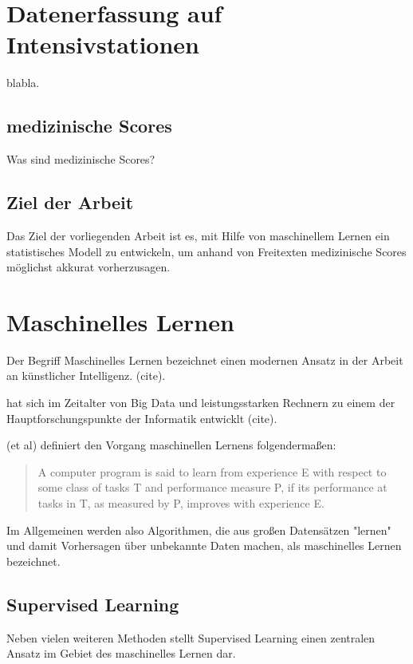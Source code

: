 \section{Datenerfassung auf Intensivstationen}

blabla. 

\subsection{medizinische Scores}
Was sind medizinische Scores?

\subsection{Ziel der Arbeit}

Das Ziel der vorliegenden Arbeit ist es, mit Hilfe von maschinellem Lernen ein statistisches Modell zu entwickeln, um anhand von Freitexten medizinische Scores möglichst akkurat vorherzusagen.

\section{Maschinelles Lernen}

Der Begriff Maschinelles Lernen bezeichnet einen modernen Ansatz in der Arbeit an künstlicher Intelligenz. (cite).

hat sich im Zeitalter von Big Data und leistungsstarken Rechnern zu einem der Hauptforschungspunkte der Informatik entwicklt (cite). 

(et al) definiert den Vorgang maschinellen Lernens folgendermaßen:

\begin{quote}
    {\foreignlanguage{english}{A computer program is said to learn from experience E with respect to some class of tasks T and performance measure P, if its performance at tasks in T, as measured by P, improves with experience E.}}
\end{quote}

Im Allgemeinen werden also Algorithmen, die aus großen Datensätzen "lernen" und damit Vorhersagen über unbekannte Daten machen, als maschinelles Lernen bezeichnet.

\subsection{Supervised Learning}

Neben vielen weiteren Methoden stellt Supervised Learning einen zentralen Ansatz im Gebiet des maschinelles Lernen dar.

